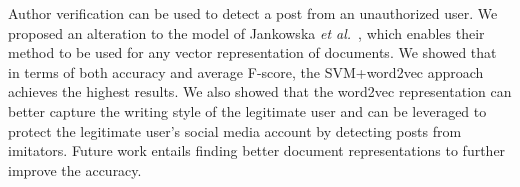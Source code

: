 \documentclass[11pt]{article}
\begin{document}
Author verification can be used to detect a post from an unauthorized user. We proposed an alteration to the model of Jankowska \emph{et al.}~\cite{jankowska2014}, which enables their
method to be used for any vector representation of documents. We
showed that in terms of both accuracy and average F-score, the
SVM+word2vec approach achieves the highest results. We also showed that
the word2vec representation can better
capture the writing style of the legitimate user and can be leveraged
to protect the legitimate user's social media account by detecting
posts from imitators. %
Future work entails finding better document representations to further
improve the accuracy.

\end{document}
